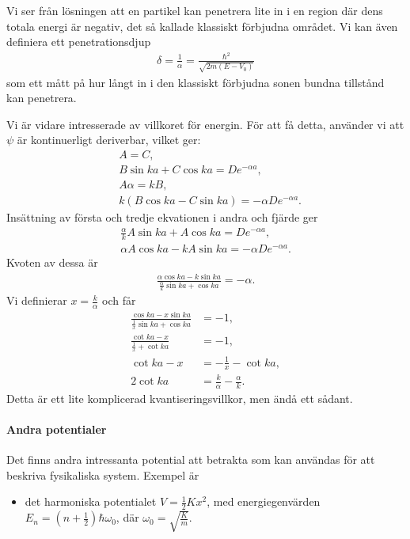 Vi ser från lösningen att en partikel kan penetrera lite in i en region där dens totala energi är negativ, det så kallade klassiskt förbjudna området. Vi kan även definiera ett penetrationsdjup
\begin{align*}
	\delta = \frac{1}{\alpha} = \frac{\hbar^{2}}{\sqrt{2m(E - V_{0})}}
\end{align*}
som ett mått på hur långt in i den klassiskt förbjudna sonen bundna tillstånd kan penetrera.

Vi är vidare intresserade av villkoret för energin. För att få detta, använder vi att $\psi$ är kontinuerligt deriverbar, vilket ger:
\begin{align*}
	&A = C, \\
	&B\sin{ka} + C\cos{ka} = De^{-\alpha a}, \\
	&A\alpha = kB, \\
	&k(B\cos{ka} - C\sin{ka}) = -\alpha De^{-\alpha a}.
\end{align*}
Insättning av första och tredje ekvationen i andra och fjärde ger
\begin{align*}
	\frac{\alpha}{k}A\sin{ka} + A\cos{ka} = De^{-\alpha a}, \\
	\alpha A\cos{ka} - kA\sin{ka} = -\alpha De^{-\alpha a}.
\end{align*}
Kvoten av dessa är
\begin{align*}
	\frac{\alpha\cos{ka} - k\sin{ka}}{\frac{\alpha}{k}\sin{ka} + \cos{ka}} = -\alpha.
\end{align*}
Vi definierar $x = \frac{k}{\alpha}$ och får
\begin{align*}
	\frac{\cos{ka} - x\sin{ka}}{\frac{1}{x}\sin{ka} + \cos{ka}} &= -1, \\
	\frac{\cot{ka} - x}{\frac{1}{x} + \cot{ka}}                 &= -1, \\
	\cot{ka} - x                                                &= -\frac{1}{x} - \cot{ka}, \\
	2\cot{ka}                                                   &= \frac{k}{\alpha} - \frac{\alpha}{k}.
\end{align*}
Detta är ett lite komplicerad kvantiseringsvillkor, men ändå ett sådant.

\paragraph{Andra potentialer}
Det finns andra intressanta potential att betrakta som kan användas för att beskriva fysikaliska system. Exempel är
\begin{itemize}
	\item det harmoniska potentialet $V = \frac{1}{2}Kx^{2}$, med energiegenvärden $E_{n} = \left(n + \frac{1}{2}\right)\hbar\omega_{0}$, där $\omega_{0} = \sqrt{\frac{K}{m}}$.
\end{itemize}

